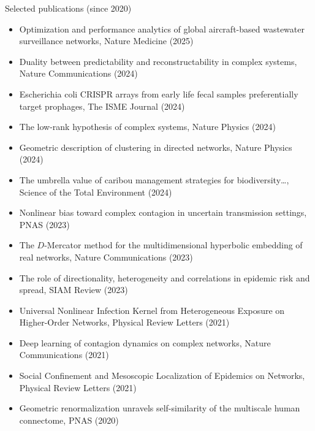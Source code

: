 \documentclass[10pt]{article}
\begin{document}
\vspace*{0\baselineskip}
\begin{minipage}[t]{\textwidth}
  {\large\color{monbleu}Selected publications (since 2020)}
  \begin{itemize}\small
    \item Optimization and performance analytics of global aircraft-based wastewater surveillance networks, Nature Medicine (2025)
    \item Duality between predictability and reconstructability in complex systems, Nature Communications (2024)
    \item Escherichia coli CRISPR arrays from early life fecal samples preferentially target prophages, The ISME Journal (2024)
    \item The low-rank hypothesis of complex systems, Nature Physics (2024)
    \item Geometric description of clustering in directed networks, Nature Physics (2024)
    \item The umbrella value of caribou management strategies for biodiversity\ldots, Science of the Total Environment (2024)
    \item Nonlinear bias toward complex contagion in uncertain transmission settings, PNAS (2023)
    \item The $D$-Mercator method for the multidimensional hyperbolic embedding of real networks, Nature Communications (2023)
    \item The role of directionality, heterogeneity and correlations in epidemic risk and spread, SIAM Review (2023)
    \item Universal Nonlinear Infection Kernel from Heterogeneous Exposure on Higher-Order Networks, Physical Review Letters (2021)
    \item Deep learning of contagion dynamics on complex networks, Nature Communications (2021)
    \item Social Confinement and Mesoscopic Localization of Epidemics on Networks, Physical Review Letters (2021)
    \item Geometric renormalization unravels self-similarity of the multiscale human connectome, PNAS (2020)
  \end{itemize}
\end{minipage}
\end{document}
